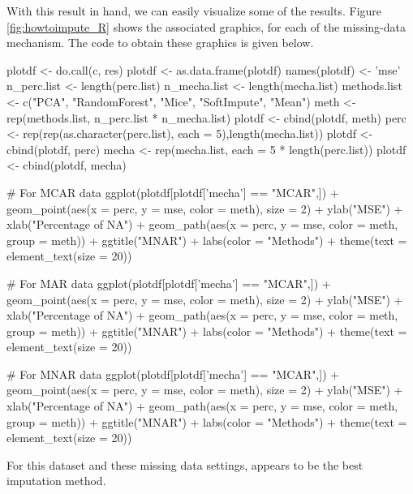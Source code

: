\begin{appendix}
With this result in hand, we can easily visualize some of the results. Figure \ref{fig:howtoimpute_R} shows the associated graphics, for each of the missing-data mechanism. The code to obtain these graphics is given below. 

\begin{example}
plotdf <- do.call(c, res)
plotdf <- as.data.frame(plotdf)
names(plotdf) <- 'mse'
n_perc.list <- length(perc.list) 
n_mecha.list <- length(mecha.list)
methods.list <- c("PCA", "RandomForest",  "Mice", "SoftImpute", "Mean")
meth <- rep(methods.list, n_perc.list * n_mecha.list)
plotdf <- cbind(plotdf, meth)
perc <- rep(rep(as.character(perc.list), each = 5),length(mecha.list))
plotdf <- cbind(plotdf, perc)
mecha <- rep(mecha.list, each = 5 * length(perc.list))
plotdf <- cbind(plotdf, mecha)

# For MCAR data 
ggplot(plotdf[plotdf['mecha'] == "MCAR",]) 
+ geom_point(aes(x = perc, y = mse, color = meth), size = 2) 
+ ylab("MSE") + xlab("Percentage of NA") 
+ geom_path(aes(x = perc, y = mse, color = meth, group = meth)) 
+ ggtitle("MNAR") + labs(color = "Methods") + theme(text = element_text(size = 20)) 

# For MAR data 
ggplot(plotdf[plotdf['mecha'] == "MCAR",]) 
+ geom_point(aes(x = perc, y = mse, color = meth), size = 2) 
+ ylab("MSE") + xlab("Percentage of NA") 
+ geom_path(aes(x = perc, y = mse, color = meth, group = meth)) 
+ ggtitle("MNAR") + labs(color = "Methods") + theme(text = element_text(size = 20)) 


# For MNAR data 
ggplot(plotdf[plotdf['mecha'] == "MCAR",]) 
+ geom_point(aes(x = perc, y = mse, color = meth), size = 2) 
+ ylab("MSE") + xlab("Percentage of NA") 
+ geom_path(aes(x = perc, y = mse, color = meth, group = meth)) 
+ ggtitle("MNAR") + labs(color = "Methods") + theme(text = element_text(size = 20)) 
\end{example}

For this dataset and these missing data settings,  appears to be the best imputation method. %


\end{appendix}

